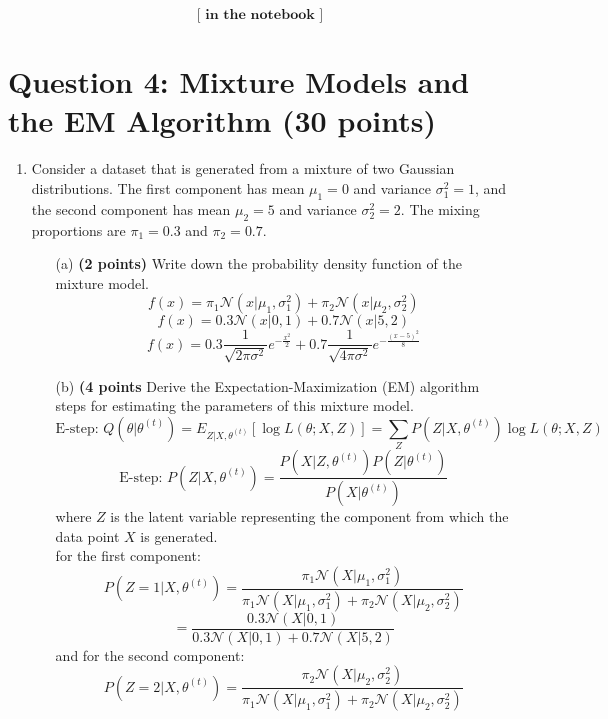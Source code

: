 \documentclass{article}
\begin{document}
\[
\textbf{[ in the notebook ]}
\]




\section*{Question 4: Mixture Models and the EM Algorithm (30 points)}

\begin{enumerate}
    \item Consider a dataset that is generated from a mixture of two Gaussian distributions. The first component has mean \(\mu_1 = 0\) and variance \(\sigma_1^2 = 1\), and the second component has mean \(\mu_2 = 5\) and variance \(\sigma_2^2 = 2\). The mixing proportions are \(\pi_1 = 0.3\) and \(\pi_2 = 0.7\).
    \begin{enumerate}
        \item[(a)] \textbf{(2 points)} Write down the probability density function of the mixture model.
        \[
        f(x) = \pi_1 \mathcal{N}(x | \mu_1, \sigma_1^2) + \pi_2 \mathcal{N}(x | \mu_2, \sigma_2^2)
        \]
        \[
        f(x) = 0.3 \mathcal{N}(x | 0, 1) + 0.7 \mathcal{N}(x | 5, 2)
        \]
        \[
        f(x) = 0.3 \frac{1}{\sqrt{2\pi\sigma^2}} e^{-\frac{x^2}{2}} + 0.7 \frac{1}{\sqrt{4\pi\sigma^2}} e^{-\frac{(x-5)^2}{8}}
        \]
        \item[(b)] \textbf{(4 points} Derive the Expectation-Maximization (EM) algorithm steps for estimating the parameters of this mixture model.
        \[
        \text{E-step: } Q(\theta | \theta^{(t)}) = E_{Z|X, \theta^{(t)}}[\log L(\theta; X, Z)] = \sum_{Z} P(Z | X, \theta^{(t)}) \log L(\theta; X, Z)
        \]
        \[
        \text{E-step: } P(Z | X, \theta^{(t)}) = \frac{P(X | Z, \theta^{(t)}) P(Z | \theta^{(t)})}{P(X | \theta^{(t)})}
        \]
        where \( Z \) is the latent variable representing the component from which the data point \( X \) is generated.
        \\ for the first component:
        \[
        P(Z = 1 | X, \theta^{(t)}) = \frac{\pi_1 \mathcal{N}(X | \mu_1, \sigma_1^2)}{\pi_1 \mathcal{N}(X | \mu_1, \sigma_1^2) + \pi_2 \mathcal{N}(X | \mu_2, \sigma_2^2)}
        \]
        \[
        = \frac{0.3 \mathcal{N}(X | 0, 1)}{0.3 \mathcal{N}(X | 0, 1) + 0.7 \mathcal{N}(X | 5, 2)}
        \]
        and for the second component:
        \[
        P(Z = 2 | X, \theta^{(t)}) = \frac{\pi_2 \mathcal{N}(X | \mu_2, \sigma_2^2)}{\pi_1 \mathcal{N}(X | \mu_1, \sigma_1^2) + \pi_2 \mathcal{N}(X | \mu_2, \sigma_2^2)}
\]
\end{enumerate}
\end{enumerate}
\end{document}
